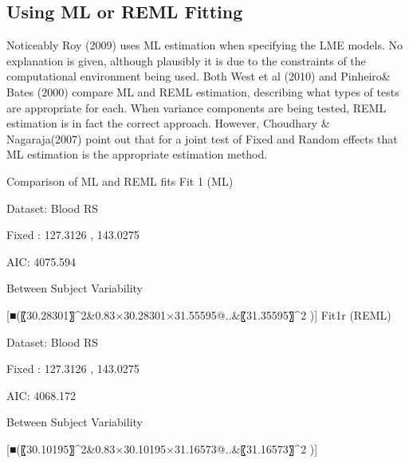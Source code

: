 \subsection*{Using ML or REML Fitting}
Noticeably Roy (2009) uses ML estimation when specifying the LME models. No explanation is given, although plausibly it is due to the constraints of the computational environment being used.
Both West et al (2010) and Pinheiro\& Bates (2000) compare ML and REML estimation, describing what types of tests are appropriate for each.  When variance components are being tested, REML estimation is in fact the correct approach. 
However, Choudhary \& Nagaraja(2007) point out  that for a joint test of Fixed and Random effects that ML estimation is the appropriate estimation method.


Comparison of ML and REML fits
Fit 1 (ML)

Dataset: Blood RS

Fixed : 127.3126 , 143.0275

AIC: 4075.594

Between Subject Variability

[■(〖30.28301〗^2&0.83×30.28301×31.55595@..&〖31.35595〗^2 )]	Fit1r (REML)

Dataset: Blood RS

Fixed : 127.3126 , 143.0275

AIC: 4068.172

Between Subject Variability

[■(〖30.10195〗^2&0.83×30.10195×31.16573@..&〖31.16573〗^2 )]


